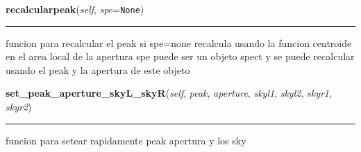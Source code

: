     \label{spectro_metria:spect:recalcularpeak}

    \vspace{0.5ex}

\hspace{.8\funcindent}\begin{boxedminipage}{\funcwidth}

    \raggedright \textbf{recalcularpeak}(\textit{self}, \textit{spe}={\tt None})

    \vspace{-1.5ex}

    \rule{\textwidth}{0.5\fboxrule}
\setlength{\parskip}{2ex}
    funcion para recalcular el peak si spe=none recalcula usando la funcion
    centroide en el area local de la apertura spe puede ser un objeto spect
    y se puede recalcular usando el peak y la apertura de este objeto

\setlength{\parskip}{1ex}
    \end{boxedminipage}

    \label{spectro_metria:spect:set_peak_aperture_skyL_skyR}

    \vspace{0.5ex}

\hspace{.8\funcindent}\begin{boxedminipage}{\funcwidth}

    \raggedright \textbf{set\_peak\_aperture\_skyL\_skyR}(\textit{self}, \textit{peak}, \textit{aperture}, \textit{skyl1}, \textit{skyl2}, \textit{skyr1}, \textit{skyr2})

    \vspace{-1.5ex}

    \rule{\textwidth}{0.5\fboxrule}
\setlength{\parskip}{2ex}
    funcion para setear rapidamente peak apertura y los sky

\setlength{\parskip}{1ex}
    \end{boxedminipage}

    \label{spectro_metria:spect:set_disp_axis}

    \vspace{0.5ex}

